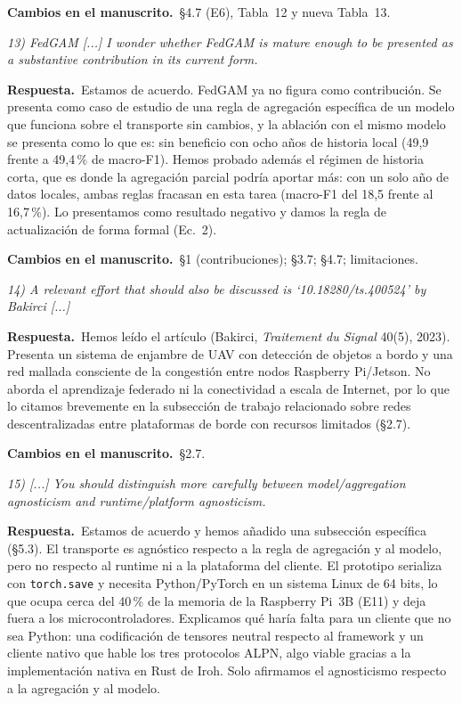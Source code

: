 \documentclass[11pt,a4paper]{article}
\newenvironment{comment}{\par\medskip\noindent\begin{minipage}{\linewidth}\color{blue!45!black}\itshape}{\end{minipage}\par}
\newcommand{\reply}{\par\smallskip\noindent\textbf{Respuesta.}~}
\newcommand{\changes}{\par\smallskip\noindent\textbf{Cambios en el manuscrito.}~}
\begin{document}
\changes \S4.7 (E6), Tabla~12 y nueva Tabla~13.

\begin{comment}
13) FedGAM [...] I wonder whether FedGAM is mature enough to be presented as a substantive contribution in its current form.
\end{comment}
\reply Estamos de acuerdo. FedGAM ya no figura como contribución. Se presenta como caso de estudio de una regla de agregación específica de un modelo que funciona sobre el transporte sin cambios, y la ablación con el mismo modelo se presenta como lo que es: sin beneficio con ocho años de historia local (49,9 frente a 49,4\,\% de macro-F1). Hemos probado además el régimen de historia corta, que es donde la agregación parcial podría aportar más: con un solo año de datos locales, ambas reglas fracasan en esta tarea (macro-F1 del 18,5 frente al 16,7\,\%). Lo presentamos como resultado negativo y damos la regla de actualización de forma formal (Ec.~2).

\changes \S1 (contribuciones); \S3.7; \S4.7; limitaciones.

\begin{comment}
14) A relevant effort that should also be discussed is `10.18280/ts.400524' by Bakirci [...]
\end{comment}
\reply Hemos leído el artículo (Bakirci, \emph{Traitement du Signal} 40(5), 2023). Presenta un sistema de enjambre de UAV con detección de objetos a bordo y una red mallada consciente de la congestión entre nodos Raspberry Pi/Jetson. No aborda el aprendizaje federado ni la conectividad a escala de Internet, por lo que lo citamos brevemente en la subsección de trabajo relacionado sobre redes descentralizadas entre plataformas de borde con recursos limitados (\S2.7).

\changes \S2.7.

\begin{comment}
15) [...] You should distinguish more carefully between model/aggregation agnosticism and runtime/platform agnosticism.
\end{comment}
\reply Estamos de acuerdo y hemos añadido una subsección específica (\S5.3). El transporte es agnóstico respecto a la regla de agregación y al modelo, pero no respecto al runtime ni a la plataforma del cliente. El prototipo serializa con \texttt{torch.save} y necesita Python/PyTorch en un sistema Linux de 64 bits, lo que ocupa cerca del 40\,\% de la memoria de la Raspberry Pi~3B (E11) y deja fuera a los microcontroladores. Explicamos qué haría falta para un cliente que no sea Python: una codificación de tensores neutral respecto al framework y un cliente nativo que hable los tres protocolos ALPN, algo viable gracias a la implementación nativa en Rust de Iroh. Solo afirmamos el agnosticismo respecto a la agregación y al modelo.
\end{document}
